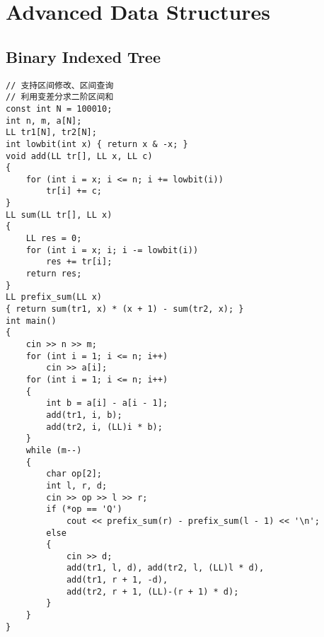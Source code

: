 \chapter{Advanced Data Structures}\label{chap:AdvancedDS}
\section{Binary Indexed Tree}
\begin{lstlisting}
// 支持区间修改、区间查询
// 利用变差分求二阶区间和
const int N = 100010;
int n, m, a[N];
LL tr1[N], tr2[N];
int lowbit(int x) { return x & -x; }
void add(LL tr[], LL x, LL c)
{
    for (int i = x; i <= n; i += lowbit(i))
        tr[i] += c;
}
LL sum(LL tr[], LL x)
{
    LL res = 0;
    for (int i = x; i; i -= lowbit(i))
        res += tr[i];
    return res;
}
LL prefix_sum(LL x)
{ return sum(tr1, x) * (x + 1) - sum(tr2, x); }
int main()
{
    cin >> n >> m;
    for (int i = 1; i <= n; i++)
        cin >> a[i];
    for (int i = 1; i <= n; i++)
    {
        int b = a[i] - a[i - 1];
        add(tr1, i, b);
        add(tr2, i, (LL)i * b);
    }
    while (m--)
    {
        char op[2];
        int l, r, d;
        cin >> op >> l >> r;
        if (*op == 'Q')
            cout << prefix_sum(r) - prefix_sum(l - 1) << '\n';
        else
        {
            cin >> d;
            add(tr1, l, d), add(tr2, l, (LL)l * d),
            add(tr1, r + 1, -d), 
            add(tr2, r + 1, (LL)-(r + 1) * d);
        }
    }
}
\end{lstlisting}
